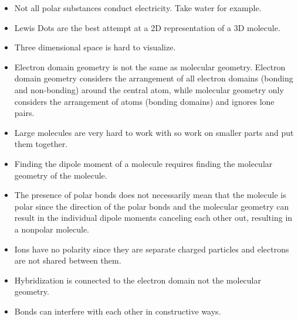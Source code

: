 \begin{itemize}
            \item Not all polar substances conduct electricity. Take water for example.
            \item Lewis Dots are the best attempt at a 2D representation of a 3D molecule. 
            \item Three dimensional space is hard to visualize.
            \item Electron domain geometry is not the same as molecular geometry. Electron domain geometry considers the arrangement of all electron domains (bonding and non-bonding) around the central atom, while molecular geometry only considers the arrangement of atoms (bonding domains) and ignores lone pairs.
            \item Large molecules are very hard to work with so work on smaller parts and put them together. 
            \item Finding the dipole moment of a molecule requires finding the molecular geometry of the molecule.
            \item The presence of polar bonds does not necessarily mean that the molecule is polar since the direction of the polar bonds and the molecular geometry can result in the individual dipole moments canceling each other out, resulting in a nonpolar molecule. 
            \item Ions have no polarity since they are separate charged particles and electrons are not shared between them.
            \item Hybridization is connected to the electron domain not the molecular geometry. 
            \item Bonds can interfere with each other in constructive ways.
            \end{itemize}
